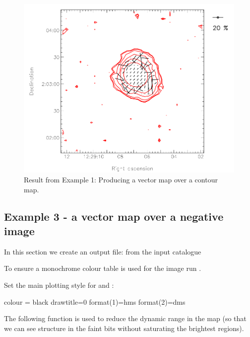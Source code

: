 \begin{figure}[t!]
\begin{center}
\includegraphics[width=0.75\linewidth]{sc22-kappa-plots-plot2.png}

\caption [Vector map with contour map in polplot]{Result from Example
  1: Producing a vector map over a contour map.\label{fig:kappa-plot2}}
\end{center}
\end{figure}

\subsection{ Example 3 - a vector map over a negative image}
\label{section:kappa-example3}


In this section we create an output file:  from the input
catalogue 

\begin{terminalv}
\end{terminalv}


To ensure a monochrome colour table is used for the image run
.

\begin{terminalv}
\end{terminalv}


Set the main plotting style for  and
:

\begin{terminalv}
colour = black
drawtitle=0
format(1)=hms
format(2)=dms
\end{terminalv}


The following function is used to reduce the dynamic range in the map (so
that we can see structure in the faint bits without saturating the
brightest regions).

